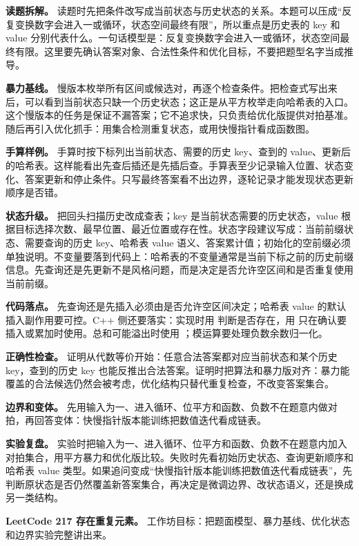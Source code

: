 \textbf{读题拆解。} 读题时先把条件改写成当前状态与历史状态的关系。本题可以压成“反复变换数字会进入一或循环，状态空间最终有限”，所以重点是历史表的 key 和 value 分别代表什么。一句话模型是：反复变换数字会进入一或循环，状态空间最终有限。这里要先确认答案对象、合法性条件和优化目标，不要把题型名字当成推导。

\textbf{暴力基线。} 慢版本枚举所有区间或候选对，再逐个检查条件。把检查式写出来后，可以看到当前状态只缺一个历史状态；这正是从平方枚举走向哈希表的入口。这个慢版本的任务是保证不漏答案；它不追求快，只负责给优化版提供对拍基准。随后再引入优化抓手：用集合检测重复状态，或用快慢指针看成函数图。

\textbf{手算样例。} 手算时按下标列出当前状态、需要的历史 key、查到的 value、更新后的哈希表。这样能看出先查后插还是先插后查。手算表至少记录输入位置、状态变化、答案更新和停止条件。只写最终答案看不出边界，逐轮记录才能发现状态更新顺序是否错。

\textbf{状态升级。} 把回头扫描历史改成查表；key 是当前状态需要的历史状态，value 根据目标选择次数、最早位置、最近位置或存在性。状态字段建议写成：当前前缀状态、需要查询的历史 key、哈希表 value 语义、答案累计值；初始化的空前缀必须单独说明。不变量要落到代码上：哈希表的不变量通常是当前下标之前的历史前缀信息。先查询还是先更新不是风格问题，而是决定是否允许空区间和是否重复使用当前前缀。

\textbf{代码落点。} 先查询还是先插入必须由是否允许空区间决定；哈希表 value 的默认插入副作用要可控。C++ 侧还要落实：实现时用  判断是否存在，用  只在确认要插入或累加时使用。总和可能溢出时使用 ；模运算要处理负数余数归一化。

\textbf{正确性检查。} 证明从代数等价开始：任意合法答案都对应当前状态和某个历史 key，查到的历史 key 也能反推出合法答案。证明时把算法和暴力版对齐：暴力能覆盖的合法候选仍然会被考虑，优化结构只替代重复检查，不改变答案集合。

\textbf{边界和变体。} 先用输入为一、进入循环、位平方和函数、负数不在题意内做对拍，再回答变体：快慢指针版本能训练把数值迭代看成链表。

\textbf{实验复盘。} 实验时把输入为一、进入循环、位平方和函数、负数不在题意内加入对拍集合，用平方暴力和优化版比较。失败时先看初始历史状态、查询更新顺序和哈希表 value 类型。如果追问变成“快慢指针版本能训练把数值迭代看成链表”，先判断原状态是否仍然覆盖新答案集合，再决定是微调边界、改状态语义，还是换成另一类结构。

\noindent\textbf{LeetCode 217 存在重复元素。} 工作坊目标：把题面模型、暴力基线、优化状态和边界实验完整讲出来。

